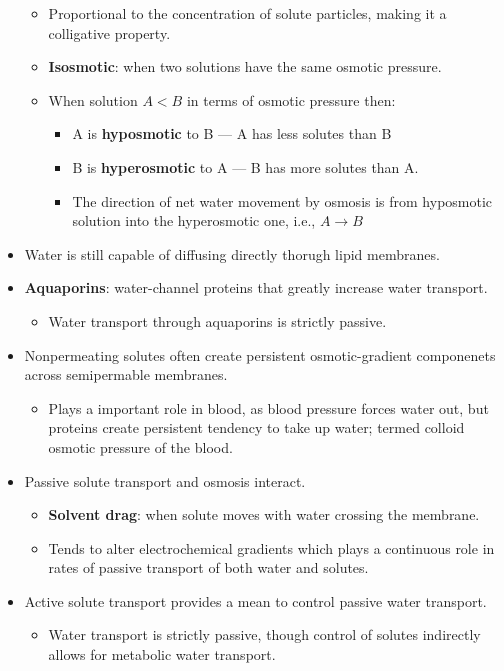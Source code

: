 \documentclass[12pt,a4paper]{article}
\begin{document}
\begin{itemize}
\begin{itemize}
            \item Proportional to the concentration of solute particles, making it a colligative property.
            \item \textbf{Isosmotic}: when two solutions have the same osmotic pressure.
            \item When solution \(A < B\) in terms of osmotic pressure then:
                \begin{itemize}
                    \item A is \textbf{hyposmotic} to B --- A has less solutes than B
                    \item B is \textbf{hyperosmotic} to A --- B has more solutes than A.
                    \item The direction of net water movement by osmosis is from hyposmotic solution into the hyperosmotic one, i.e., \(A \rightarrow B\)
                \end{itemize}
        \end{itemize}
    \item Water is still capable of diffusing directly thorugh lipid membranes.
    \item \textbf{Aquaporins}: water-channel proteins that greatly increase water transport.
        \begin{itemize}
            \item Water transport through aquaporins is strictly passive.
        \end{itemize}
    \item Nonpermeating solutes often create persistent osmotic-gradient componenets across semipermable membranes.
        \begin{itemize}
            \item Plays a important role in blood, as blood pressure forces water out, but proteins create persistent tendency to take up water; termed {\color{o-Sun}colloid osmotic pressure} of the blood.
        \end{itemize}
    \item Passive solute transport and osmosis interact. 
        \begin{itemize}
            \item \textbf{Solvent drag}: when solute moves with water crossing the membrane.
            \item Tends to alter electrochemical gradients which plays a continuous role in rates of passive transport of both water and solutes.
        \end{itemize}
    \item Active solute transport provides a mean to control passive water transport.
        \begin{itemize}
            \item Water transport is strictly passive, though control of solutes indirectly allows for metabolic water transport.
        \end{itemize}
\end{itemize}
\end{document}
